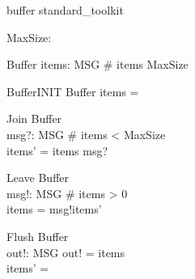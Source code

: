 \documentclass{article}
\begin{document}
\begin{zsection}
  \SECTION buffer \parents standard\_toolkit
\end{zsection}

\begin{zed}
  [MSG]
\end{zed}

\begin{axdef}
  MaxSize: \nat
\end{axdef}

\begin{schema}{Buffer}
  items: \seq  MSG
\where
  \# items \leq  MaxSize
\end{schema}

\begin{schema}{BufferINIT}
  Buffer
\where
  items = \langle \rangle
\end{schema}


\begin{schema}{Join}
  \Delta Buffer\\
  msg?: MSG
\where
  \# items < MaxSize\\
  items' = items \cat  \langle msg?\rangle
\end{schema}


\begin{schema}{Leave}
  \Delta Buffer\\
  msg!: MSG
\where
  \# items > 0\\
  items = \langle msg!\rangle  \cat  items'
\end{schema}



\begin{schema}{Flush}
  \Delta Buffer\\
  out!: \seq  MSG
\where
  out! = items\\
  items' = \langle \rangle
\end{schema}
\end{document}
